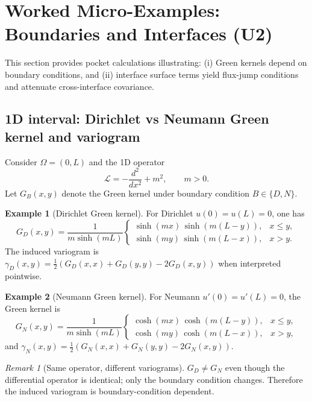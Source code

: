 \documentclass[11pt]{article}
\theoremstyle{definition}
\newtheorem{example}{Example}[section]
\theoremstyle{plain}
\theoremstyle{remark}
\newtheorem{remark}{Remark}[section]
\begin{document}
\section{Worked Micro-Examples: Boundaries and Interfaces (U2)}\label{sec:worked}

This section provides pocket calculations illustrating:
(i) Green kernels depend on boundary conditions, and
(ii) interface surface terms yield flux-jump conditions and attenuate cross-interface covariance.

\subsection{1D interval: Dirichlet vs Neumann Green kernel and variogram}\label{sec:worked-1d}

Consider $\Omega=(0,L)$ and the 1D operator
\[
\mathcal{L}=-\frac{d^2}{dx^2}+m^2,\qquad m>0.
\]
Let $G_B(x,y)$ denote the Green kernel under boundary condition $B\in\{D,N\}$.

\begin{example}[Dirichlet Green kernel]\label{ex:dirichlet-green}
For Dirichlet $u(0)=u(L)=0$, one has
\[
G_D(x,y)=\frac{1}{m\sinh(mL)}
\begin{cases}
\sinh(mx)\,\sinh(m(L-y)), & x\le y,\\[2pt]
\sinh(my)\,\sinh(m(L-x)), & x>y.
\end{cases}
\]
The induced variogram is $\gamma_D(x,y)=\tfrac12(G_D(x,x)+G_D(y,y)-2G_D(x,y))$ when interpreted pointwise.
\end{example}

\begin{example}[Neumann Green kernel]\label{ex:neumann-green}
For Neumann $u'(0)=u'(L)=0$, the Green kernel is
\[
G_N(x,y)=\frac{1}{m\sinh(mL)}
\begin{cases}
\cosh(mx)\,\cosh(m(L-y)), & x\le y,\\[2pt]
\cosh(my)\,\cosh(m(L-x)), & x>y,
\end{cases}
\]
and $\gamma_N(x,y)=\tfrac12(G_N(x,x)+G_N(y,y)-2G_N(x,y))$.
\end{example}

\begin{remark}[Same operator, different variograms]
$G_D\neq G_N$ even though the differential operator is identical; only the boundary condition changes.
Therefore the induced variogram is boundary-condition dependent.
\end{remark}
\end{document}
